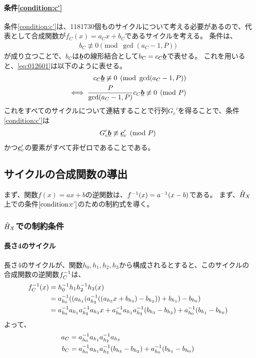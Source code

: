 \documentclass[a4paper,11pt,dvipdfmx]{jsarticle}
\theoremstyle{definition}
\begin{document}
\paragraph{条件\ref{condition:c'}}
条件\ref{condition:c'}は、1181730個ものサイクルについて考える必要があるので、代表として合成関数が$f_C(x) = a_C x + b_C$であるサイクルを考える。
条件は、
\begin{align}
  b_C \not\equiv 0 \pmod{\gcd(a_C-1, P)}\label{eq:012601}
\end{align}
が成り立つことで、$b_C$は$\underline{\bm{b}}$の線形結合として$b_C = c_C \underline{\bm{b}}$で表せる。
これを用いると、\eqref{eq:012601}は以下のように表せる。
\begin{align}
  c_C\underline{\bm{b}} \not\equiv 0 \pmod{\gcd(a_C-1, P)}\label{eq:012602}\\
  \iff \frac{P}{\gcd(a_C-1, P)}c_C\underline{\bm{b}} \not\equiv 0 \pmod{P}\label{eq:012603}
\end{align}
これをすべてのサイクルについて連結することで行列$G_c'$を得ることで、条件\ref{condition:c'}は
\begin{align}
  G_c'\underline{\bm{b}} \not\equiv \underline{\bm{c}}_c' \pmod P
\end{align}
かつ$\underline{\bm{c}}_c'$の要素がすべて非ゼロであることである。
\subsection{サイクルの合成関数の導出}
まず、関数$f(x)=ax+b$の逆関数は、$f^{-1}(x)=a^{-1}(x - b)$である。
まず、$\hat{H}_X$上での条件$\ref{condition:c'}$のための制約式を導く。

\subsubsection{$\hat{H}_X$での制約条件}

\paragraph{長さ4のサイクル}
長さ4のサイクルが、関数$h_0, h_1, h_2, h_3$から構成されるとすると、このサイクルの合成関数の逆関数$f_C^{-1}$は、
\begin{align}
  f_C^{-1}(x) &= h_0^{-1} h_1 h_2^{-1} h_3(x)\\
  &=a_{h_0}^{-1}((a_{h_1}(a_{h_2}^{-1}((a_{h_3}x+b_{h_3})-b_{h_2}))+b_{h_1})-b_{h_0})\\
  &= a_{h_0}^{-1} a_{h_1}a_{h_2}^{-1} a_{h_3}x + a_{h_0}^{-1} a_{h_1}a_{h_2}^{-1}(b_{h_3}-b_{h_2}) + a_{h_0}^{-1}(b_{h_1}-b_{h_0})
\end{align}
よって、
\begin{align}
  a_C &= a_{h_0}^{-1} a_{h_1}a_{h_2}^{-1} a_{h_3}\\
  b_C &= a_{h_0}^{-1} a_{h_1}a_{h_2}^{-1}(b_{h_3}-b_{h_2}) + a_{h_0}^{-1}(b_{h_1}-b_{h_0})
\end{align}
\end{document}
